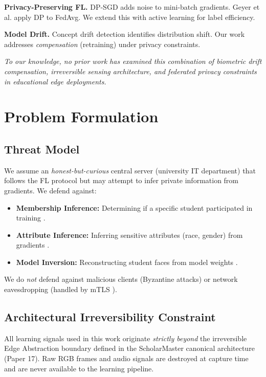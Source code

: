 \documentclass[conference]{IEEEtran}
\begin{document}
\textbf{Privacy-Preserving FL.} DP-SGD \cite{b13} adds noise to mini-batch gradients. Geyer et al. \cite{b14} apply DP to FedAvg. We extend this with active learning for label efficiency.

\textbf{Model Drift.} Concept drift detection \cite{b15} identifies distribution shift. Our work addresses \textit{compensation} (retraining) under privacy constraints.

\textit{To our knowledge, no prior work has examined this combination of biometric drift compensation, irreversible sensing architecture, and federated privacy constraints in educational edge deployments.}

\section{Problem Formulation}

\subsection{Threat Model}

We assume an \textit{honest-but-curious} central server (university IT department) that follows the FL protocol but may attempt to infer private information from gradients. We defend against:

\begin{itemize}
    \item \textbf{Membership Inference:} Determining if a specific student participated in training \cite{b16}.
    \item \textbf{Attribute Inference:} Inferring sensitive attributes (race, gender) from gradients \cite{b17}.
    \item \textbf{Model Inversion:} Reconstructing student faces from model weights \cite{b18}.
\end{itemize}

We do \textit{not} defend against malicious clients (Byzantine attacks) or network eavesdropping (handled by mTLS \cite{b1}).

\subsection{Architectural Irreversibility Constraint}

All learning signals used in this work originate \textit{strictly beyond} the irreversible Edge Abstraction boundary defined in the ScholarMaster canonical architecture (Paper 17). Raw RGB frames and audio signals are destroyed at capture time and are never available to the learning pipeline.
\end{document}
